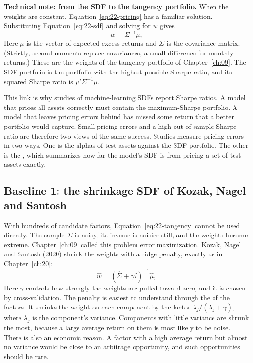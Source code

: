 \begin{technote}
\textbf{Technical note: from the SDF to the tangency portfolio.} When the weights are constant, Equation~\eqref{eq:22-pricing} has a familiar solution. Substituting Equation~\eqref{eq:22-sdf} and solving for $w$ gives
\begin{equation}
  w = \Sigma^{-1} \mu,
  \label{eq:22-tangency}
\end{equation}
Here $\mu$ is the vector of expected excess returns and $\Sigma$ is the covariance matrix. (Strictly, second moments replace covariances, a small difference for monthly returns.) These are the weights of the tangency portfolio of Chapter~\ref{ch:09}. The SDF portfolio is the portfolio with the highest possible Sharpe ratio, and its squared Sharpe ratio is $\mu'\Sigma^{-1}\mu$.
\end{technote}

This link is why studies of machine-learning SDFs report Sharpe ratios. A model that prices all assets correctly must contain the maximum-Sharpe portfolio. A model that leaves pricing errors behind has missed some return that a better portfolio would capture. Small pricing errors and a high out-of-sample Sharpe ratio are therefore two views of the same success. Studies measure pricing errors in two ways. One is the alphas of test assets against the SDF portfolio. The other is the , which summarizes how far the model's SDF is from pricing a set of test assets exactly.

\subsection{Baseline 1: the shrinkage SDF of Kozak, Nagel and Santosh}

With hundreds of candidate factors, Equation~\eqref{eq:22-tangency} cannot be used directly. The sample $\Sigma$ is noisy, its inverse is noisier still, and the weights become extreme. Chapter~\ref{ch:09} called this problem error maximization. Kozak, Nagel and Santosh (2020) shrink the weights with a ridge penalty, exactly as in Chapter~\ref{ch:20}:
\begin{equation}
  \hat w = \left(\hat\Sigma + \gamma I\right)^{-1} \hat\mu,
  \label{eq:22-kns}
\end{equation}
Here $\gamma$ controls how strongly the weights are pulled toward zero, and it is chosen by cross-validation. The penalty is easiest to understand through the  of the factors. It shrinks the weight on each component by the factor $\lambda_j/(\lambda_j+\gamma)$, where $\lambda_j$ is the component's variance. Components with little variance are shrunk the most, because a large average return on them is most likely to be noise. There is also an economic reason. A factor with a high average return but almost no variance would be close to an arbitrage opportunity, and such opportunities should be rare.

